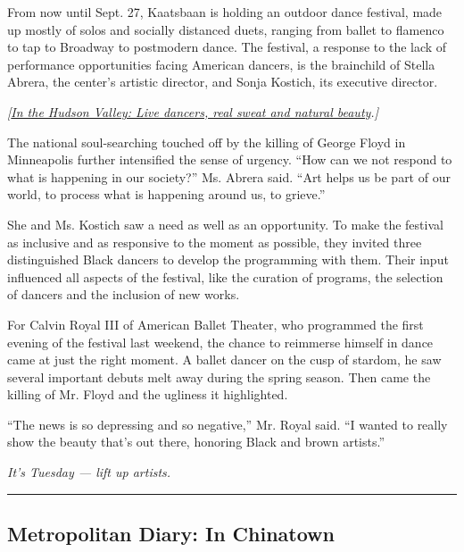From now until Sept. 27, Kaatsbaan is holding an outdoor dance festival,
made up mostly of solos and socially distanced duets, ranging from
ballet to flamenco to tap to Broadway to postmodern dance. The festival,
a response to the lack of performance opportunities facing American
dancers, is the brainchild of Stella Abrera, the center's artistic
director, and Sonja Kostich, its executive director.

\emph{{[}}\href{https://www.nytimes.com/2020/07/29/arts/dance/kaatsbaan-dance-festival-stella-abrera.html}{\emph{In
the Hudson Valley: Live dancers, real sweat and natural
beauty}}\emph{.{]}}

The national soul-searching touched off by the killing of George Floyd
in Minneapolis further intensified the sense of urgency. ``How can we
not respond to what is happening in our society?'' Ms. Abrera said.
``Art helps us be part of our world, to process what is happening around
us, to grieve.''

She and Ms. Kostich saw a need as well as an opportunity. To make the
festival as inclusive and as responsive to the moment as possible, they
invited three distinguished Black dancers to develop the programming
with them. Their input influenced all aspects of the festival, like the
curation of programs, the selection of dancers and the inclusion of new
works.

For Calvin Royal III of American Ballet Theater, who programmed the
first evening of the festival last weekend, the chance to reimmerse
himself in dance came at just the right moment. A ballet dancer on the
cusp of stardom, he saw several important debuts melt away during the
spring season. Then came the killing of Mr. Floyd and the ugliness it
highlighted.

``The news is so depressing and so negative,'' Mr. Royal said. ``I
wanted to really show the beauty that's out there, honoring Black and
brown artists.''

\emph{It's Tuesday --- lift up artists.}

\begin{center}\rule{0.5\linewidth}{\linethickness}\end{center}

\hypertarget{metropolitan-diary-in-chinatown}{%
\subsection{Metropolitan Diary: In
Chinatown}\label{metropolitan-diary-in-chinatown}}

